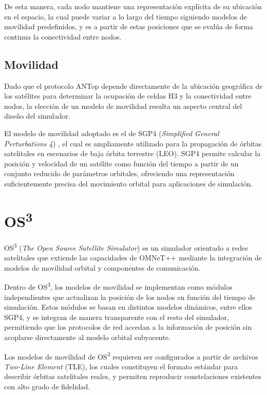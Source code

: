 De esta manera, cada nodo mantiene una representación explícita de su ubicación en el espacio, la cual puede variar a lo largo del tiempo siguiendo modelos de movilidad predefinidos, y es a partir de estas posiciones que se evalúa de forma continua la conectividad entre nodos.

\subsection{Movilidad}

Dado que el protocolo ANTop depende directamente de la ubicación geográfica de los satélites para determinar la ocupación de celdas H3 y la conectividad entre nodos, la elección de un modelo de movilidad resulta un aspecto central del diseño del simulador.

El modelo de movilidad adoptado es el de SGP4 (\textit{Simplified General Perturbations 4}) \cite{SGP4}, el cual es ampliamente utilizado para la propagación de órbitas satelitales en escenarios de baja órbita terrestre (LEO). SGP4 permite calcular la posición y velocidad de un satélite como función del tiempo a partir de un conjunto reducido de parámetros orbitales, ofreciendo una representación suficientemente precisa del movimiento orbital para aplicaciones de simulación.

\section{OS\textsuperscript{3}}

OS\textsuperscript{3} (\textit{The Open Source Satellite Simulator}) \cite{os3} es un simulador orientado a redes satelitales que extiende las capacidades de OMNeT++ mediante la integración de modelos de movilidad orbital y componentes de comunicación.

Dentro de OS\textsuperscript{3}, los modelos de movilidad se implementan como módulos independientes que actualizan la posición de los nodos en función del tiempo de simulación. Estos módulos se basan en distintos modelos dinámicos, entre ellos SGP4, y se integran de manera transparente con el resto del simulador, permitiendo que los protocolos de red accedan a la información de posición sin acoplarse directamente al modelo orbital subyacente.

Los modelos de movilidad de OS\textsuperscript{3} requieren ser configurados a partir de archivos \textit{Two-Line Element} (TLE), los cuales constituyen el formato estándar para describir órbitas satelitales reales, y permiten reproducir constelaciones existentes con alto grado de fidelidad.

